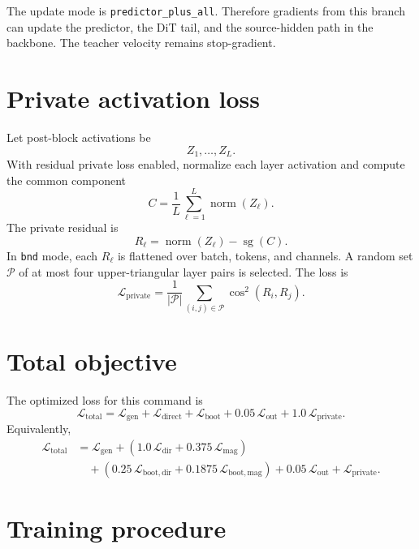 \documentclass[11pt]{article}
\begin{document}
The update mode is \texttt{predictor\_plus\_all}. Therefore gradients from this
branch can update the predictor, the DiT tail, and the source-hidden path in the
backbone. The teacher velocity remains stop-gradient.

\section{Private activation loss}

Let post-block activations be
\[
  Z_1,\ldots,Z_L.
\]
With residual private loss enabled, normalize each layer activation and compute
the common component
\[
  C=\frac{1}{L}\sum_{\ell=1}^{L}\operatorname{norm}(Z_\ell).
\]
The private residual is
\[
  R_\ell=\operatorname{norm}(Z_\ell)-\operatorname{sg}(C).
\]
In \texttt{bnd} mode, each $R_\ell$ is flattened over batch, tokens, and
channels. A random set $\mathcal{P}$ of at most four upper-triangular layer pairs
is selected. The loss is
\[
  \mathcal{L}_{\mathrm{private}}
  =
  \frac{1}{|\mathcal{P}|}
  \sum_{(i,j)\in\mathcal{P}}
  \cos^2(R_i,R_j).
\]

\section{Total objective}

The optimized loss for this command is
\[
\boxed{
  \mathcal{L}_{\mathrm{total}}
  =
  \mathcal{L}_{\mathrm{gen}}
  +
  \mathcal{L}_{\mathrm{direct}}
  +
  \mathcal{L}_{\mathrm{boot}}
  +
  0.05\,\mathcal{L}_{\mathrm{out}}
  +
  1.0\,\mathcal{L}_{\mathrm{private}}.
}
\]
Equivalently,
\[
\begin{aligned}
  \mathcal{L}_{\mathrm{total}}
  &=
  \mathcal{L}_{\mathrm{gen}}
  +
  \left(
    1.0\,\mathcal{L}_{\mathrm{dir}}
    +
    0.375\,\mathcal{L}_{\mathrm{mag}}
  \right) \\
  &\quad+
  \left(
    0.25\,\mathcal{L}_{\mathrm{boot,dir}}
    +
    0.1875\,\mathcal{L}_{\mathrm{boot,mag}}
  \right)
  +
  0.05\,\mathcal{L}_{\mathrm{out}}
  +
  \mathcal{L}_{\mathrm{private}}.
\end{aligned}
\]

\section{Training procedure}
\end{document}

